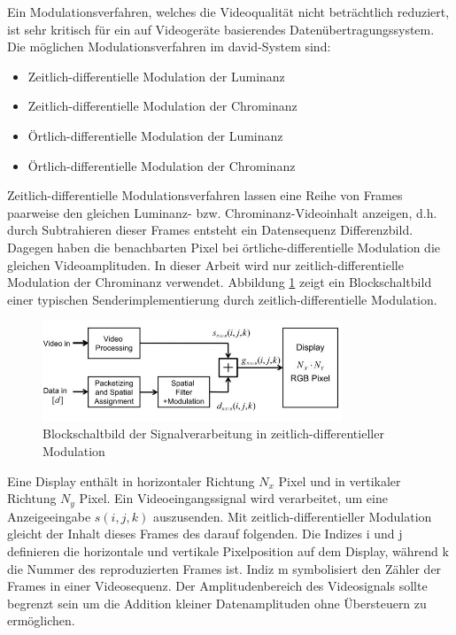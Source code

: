 Ein Modulationsverfahren, welches die Videoqualität nicht beträchtlich reduziert, ist sehr kritisch für ein auf Videogeräte basierendes Datenübertragungssystem. Die möglichen Modulationsverfahren im \gls{david}-System sind:
\begin{itemize}
	\item Zeitlich-differentielle Modulation der Luminanz
	\item Zeitlich-differentielle Modulation der Chrominanz
	\item Örtlich-differentielle Modulation der Luminanz
	\item Örtlich-differentielle Modulation der Chrominanz
\end{itemize}

Zeitlich-differentielle Modulationsverfahren lassen eine Reihe von Frames paarweise den gleichen Luminanz- bzw. Chrominanz-Videoinhalt anzeigen, d.h. durch Subtrahieren dieser Frames entsteht ein Datensequenz Differenzbild. Dagegen haben die benachbarten Pixel bei örtliche-differentielle Modulation die gleichen Videoamplituden. In dieser Arbeit wird nur zeitlich-differentielle Modulation der Chrominanz verwendet. Abbildung \ref{fig:David3} zeigt ein Blockschaltbild einer typischen Senderimplementierung durch zeitlich-differentielle Modulation.

\begin{figure}[htb]
	\centering 
	\includegraphics[keepaspectratio,width=0.8\textwidth]{images/2_DaViD/David2.jpg}
	\caption{Blockschaltbild der Signalverarbeitung in zeitlich-differentieller Modulation}
	\label{fig:David3}
\end{figure}

Eine Display enthält in horizontaler Richtung $N_x$ Pixel und in vertikaler Richtung $N_y$ Pixel. Ein Videoeingangssignal wird verarbeitet, um eine Anzeigeeingabe $s(i,j,k)$ auszusenden. Mit zeitlich-differentieller Modulation gleicht der Inhalt dieses Frames des darauf folgenden. Die Indizes i und j definieren die horizontale und vertikale Pixelposition auf dem Display, während k die Nummer des reproduzierten Frames ist. Indiz m symbolisiert den Zähler der Frames in einer Videosequenz. Der Amplitudenbereich des Videosignals sollte begrenzt sein um die Addition kleiner Datenamplituden ohne Übersteuern zu ermöglichen.


